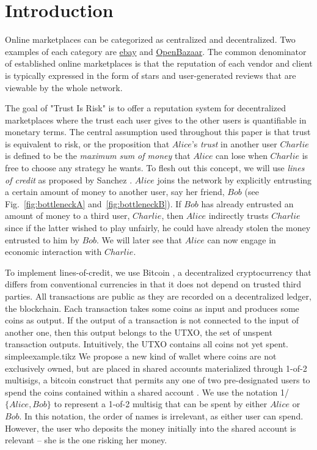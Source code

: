 \section{Introduction}
  Online marketplaces can be categorized as centralized and decentralized.
  Two examples of each category are \href{http://www.ebay.com}{ebay} and \href{https://openbazaar.org/}{OpenBazaar}.
  The common denominator of established online marketplaces is that the reputation of each vendor and client is typically
  expressed in the form of stars and user-generated reviews that are viewable by the whole network.

  The goal of "Trust Is Risk" is to offer a reputation system for decentralized marketplaces where the trust each user gives
  to the other users is quantifiable in monetary terms. The central assumption used throughout this paper is that trust is
  equivalent to risk, or the proposition that $Alice$'s \textit{trust} in another user $Charlie$ is defined to be the
  \textit{maximum sum of money} that $Alice$ can lose when $Charlie$ is free to choose any strategy he wants. To flesh out
  this concept, we will use \textit{lines of credit} as proposed by Sanchez \cite{loc}. $Alice$ joins the network by
  explicitly entrusting a certain amount of money to another user, say her friend, $Bob$ (see Fig.~\ref{fig:bottleneckA}
  and~\ref{fig:bottleneckB}). If $Bob$ has already entrusted an amount of money to a third user, $Charlie$, then $Alice$
  indirectly trusts $Charlie$ since if the latter wished to play unfairly, he could have already stolen the money entrusted to
  him by $Bob$. We will later see that $Alice$ can now engage in economic interaction with $Charlie$.

  To implement lines-of-credit, we use Bitcoin \cite{bitcoin}, a decentralized cryptocurrency that differs from conventional
  currencies in that it does not depend on trusted third parties. All transactions are public as they are recorded on a
  decentralized ledger, the blockchain. Each transaction takes some coins as input and produces some coins as output. If the
  output of a transaction is not connected to the input of another one, then this output belongs to the UTXO, the set of
  unspent transaction outputs. Intuitively, the UTXO contains all coins not yet spent.
  \medskip \ \\
  {simpleexample.tikz}
  \noindent We propose a new kind of wallet where coins are not exclusively owned, but are placed in shared accounts materialized
  through 1-of-2 multisigs, a bitcoin construct that permits any one of two pre-designated users to spend the coins contained
  within a shared account \cite{masteringbitcoin}. We use the notation 1/$\{Alice, Bob\}$ to represent a 1-of-2 multisig that
  can be spent by either $Alice$ or $Bob$. In this notation, the order of names is irrelevant, as either user can spend.
  However, the user who deposits the money initially into the shared account is relevant -- she is the one risking her money.

